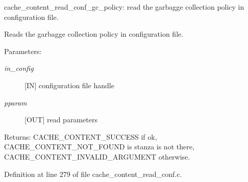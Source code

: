 cache\_\-content\_\-read\_\-conf\_\-gc\_\-policy: read the garbagge collection policy in configuration file.

Reads the garbagge collection policy in configuration file.

\begin{Desc}
\item[Parameters:]
\begin{description}
\item[{\em in\_\-config}][IN] configuration file handle \item[{\em pparam}][OUT] read parameters\end{description}
\end{Desc}
\begin{Desc}
\item[Returns:]CACHE\_\-CONTENT\_\-SUCCESS if ok, CACHE\_\-CONTENT\_\-NOT\_\-FOUND is stanza is not there, CACHE\_\-CONTENT\_\-INVALID\_\-ARGUMENT otherwise. \end{Desc}


Definition at line 279 of file cache\_\-content\_\-read\_\-conf.c.